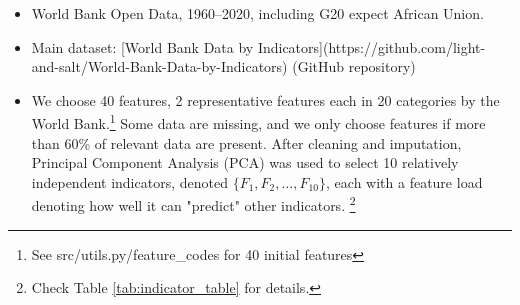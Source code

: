 \documentclass[12pt]{article}
\begin{document}
\begin{itemize}
    \item World Bank Open Data, 1960--2020, including G20 expect African Union.
    \item Main dataset: [World Bank Data by Indicators](https://github.com/light-and-salt/World-Bank-Data-by-Indicators) (GitHub repository)
    \item We choose 40 features, 2 representative features each in 20 categories by the World Bank.\footnote{See src/utils.py/feature\_codes for 40 initial features}
Some data are missing, and we only choose features if more than 60\% of relevant data are present. After cleaning and imputation, Principal Component Analysis (PCA) was used to select 10 relatively independent indicators, denoted $\{F_1, F_2, \ldots, F_{10}\}$, each with a feature load denoting how well it can "predict" other indicators. \footnote{Check Table \ref{tab:indicator_table} for details.}
\end{itemize}

\begin{table}[H]
    \centering
    \small
    \caption{Indicator Table}
    \label{tab:indicator_table}
\end{table}
\end{document}

